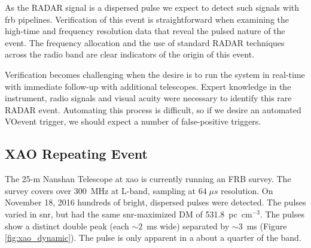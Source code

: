 \documentclass[a4paper,fleqn,usenatbib]{mnras}
\begin{document}
As the RADAR signal is a dispersed pulse we expect to detect such signals with
\gls{frb} pipelines.  Verification of this event is straightforward when
examining the high-time and frequency resolution data that reveal the pulsed
nature of the event.  The frequency allocation and the use of standard RADAR
techniques across the radio band are clear indicators of the origin of this
event.  

Verification becomes challenging when the desire is to run the system in
real-time with immediate follow-up with additional telescopes.  Expert knowledge
in the instrument, radio signals and visual acuity were necessary to identify
this rare RADAR event.  Automating this process is difficult, so if we desire an
automated VOevent trigger, we should expect a number of false-positive triggers.

\subsection{XAO Repeating Event}
\label{sec:xao_event}

The 25-m Nanshan Telescope at \gls{xao} is currently running an FRB survey. The
survey covers over 300~MHz at L-band, sampling at $64 \; \mu s$ resolution. On
November 18, 2016 hundreds of bright, dispersed pulses were detected. The pulses
varied in \gls{snr}, but had the same \gls{snr}-maximized DM of 531.8~pc~cm$^{-3}$. The
pulses show a distinct double peak (each $\sim 2$~ms wide) separated by $\sim
3$~ms (Figure \ref{fig:xao_dynamic}). The pulse is only apparent in a about a
quarter of the band.
\end{document}
